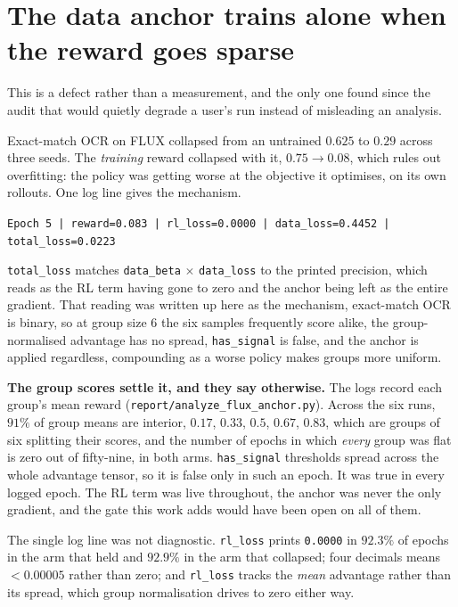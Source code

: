 \documentclass[11pt]{article}
\newcommand{\code}[1]{\texttt{\small #1}}
\begin{document}
\section{The data anchor trains alone when the reward goes sparse}

This is a defect rather than a measurement, and the only one found since the audit that would quietly degrade a user's run instead of misleading an analysis.

Exact-match OCR on FLUX collapsed from an untrained $0.625$ to $0.29$ across three seeds. The \emph{training} reward collapsed with it, $0.75 \to 0.08$, which rules out overfitting: the policy was getting worse at the objective it optimises, on its own rollouts. One log line gives the mechanism.

\begin{center}
\code{Epoch 5 | reward=0.083 | rl\_loss=0.0000 | data\_loss=0.4452 | total\_loss=0.0223}
\end{center}

\noindent \code{total\_loss} matches \code{data\_beta} $\times$ \code{data\_loss} to the printed precision, which reads as the RL term having gone to zero and the anchor being left as the entire gradient. That reading was written up here as the mechanism, exact-match OCR is binary, so at group size 6 the six samples frequently score alike, the group-normalised advantage has no spread, \code{has\_signal} is false, and the anchor is applied regardless, compounding as a worse policy makes groups more uniform.

\textbf{The group scores settle it, and they say otherwise.} The logs record each group's mean reward (\code{report/analyze\_flux\_anchor.py}). Across the six runs, $91\%$ of group means are interior, $0.17$, $0.33$, $0.5$, $0.67$, $0.83$, which are groups of six splitting their scores, and the number of epochs in which \emph{every} group was flat is zero out of fifty-nine, in both arms. \code{has\_signal} thresholds spread across the whole advantage tensor, so it is false only in such an epoch. It was true in every logged epoch. The RL term was live throughout, the anchor was never the only gradient, and the gate this work adds would have been open on all of them.

The single log line was not diagnostic. \code{rl\_loss} prints \code{0.0000} in $92.3\%$ of epochs in the arm that held and $92.9\%$ in the arm that collapsed; four decimals means $<0.00005$ rather than zero; and \code{rl\_loss} tracks the \emph{mean} advantage rather than its spread, which group normalisation drives to zero either way.
\end{document}
